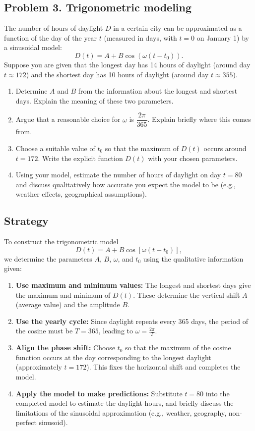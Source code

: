 \subsection{Problem 3. Trigonometric modeling}
The number of hours of daylight $D$ in a certain city can be approximated as a function of the day of the year $t$ (measured in days, with $t=0$ on January 1) by a sinusoidal model:
\[D(t)=A+B \cos(\omega(t-t_{0})).\]
Suppose you are given that the longest day has 14 hours of daylight (around day $t\approx172$) and the shortest day has 10 hours of daylight (around day $t\approx355$).

\begin{enumerate}[label=(\alph*)]
    \item Determine $A$ and $B$ from the information about the longest and shortest days. Explain the meaning of these two parameters.
    \item Argue that a reasonable choice for $\omega$ is $\dfrac{2\pi}{365}$. Explain briefly where this comes from.
    \item Choose a suitable value of $t_{0}$ so that the maximum of $D(t)$ occurs around $t=172$. Write the explicit function $D(t)$ with your chosen parameters.
    \item Using your model, estimate the number of hours of daylight on day $t=80$ and discuss qualitatively how accurate you expect the model to be (e.g., weather effects, geographical assumptions).
\end{enumerate}

\subsection*{Strategy}

To construct the trigonometric model
\[
D(t) = A + B\cos\!\left[\omega(t - t_0)\right],
\]
we determine the parameters $A$, $B$, $\omega$, and $t_0$ using the qualitative
information given:

\begin{enumerate}[label=(\alph*)]
    \item \textbf{Use maximum and minimum values:}  
    The longest and shortest days give the maximum and minimum of $D(t)$.
    These determine the vertical shift $A$ (average value) and the amplitude
    $B$.

    \item \textbf{Use the yearly cycle:}  
    Since daylight repeats every 365 days, the period of the cosine must be
    $T=365$, leading to $\omega = \frac{2\pi}{T}$.

    \item \textbf{Align the phase shift:}  
    Choose $t_0$ so that the maximum of the cosine function occurs at the day
    corresponding to the longest daylight (approximately $t=172$).  
    This fixes the horizontal shift and completes the model.

    \item \textbf{Apply the model to make predictions:}  
    Substitute $t=80$ into the completed model to estimate the daylight hours,
    and briefly discuss the limitations of the sinusoidal approximation
    (e.g., weather, geography, non-perfect sinusoid).
\end{enumerate}

